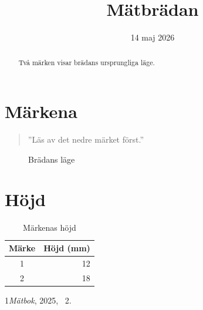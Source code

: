 \documentclass{article}
\begin{document}
\title{Mätbrädan}\author{}\date{14 maj 2026}\maketitle
\begin{abstract}Två märken visar brädans ursprungliga läge.\end{abstract}
\tableofcontents
\section{Märkena}\begin{quote}”Läs av det nedre märket först.”\end{quote}
\begin{figure}[ht]\centering\fbox{\rule{0pt}{8mm}\rule{33mm}{0pt}}\caption{Brädans läge}\end{figure}
\section{Höjd}
\begin{table}[ht]\centering\begin{tabular}{cr}Märke&Höjd (mm)\\\hline 1&12\\2&18\end{tabular}\caption{Märkenas höjd}\end{table}
\begin{thebibliography}{1}\emph{Mätbok}, 2025, \chaptername~2.\end{thebibliography}
\end{document}
